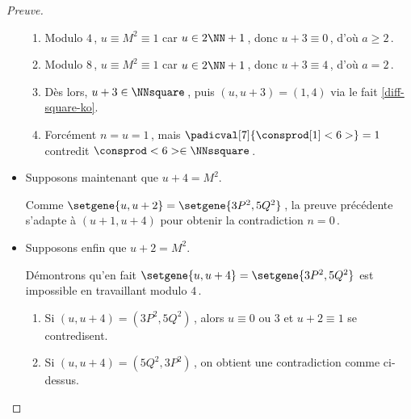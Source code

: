 \begin{proof}[Preuve]
\begin{itemize}
\begin{enumerate}
			\item Modulo $4$\,, $u \equiv M^2 \equiv 1$ car $u \in 2 \NN + 1$\,,
			donc $u + 3 \equiv 0$\,, d'où $a \geq 2$\,.

			\item Modulo $8$\,, $u \equiv M^2 \equiv 1$ car $u \in 2 \NN + 1$\,,
			donc $u + 3 \equiv 4$\,, d'où $a = 2$\,.

			\item Dès lors, $u + 3 \in \NNsquare$\,, puis $(u, u + 3) = (1, 4)$ via le fait \ref{diff-square-ko}.

			\item Forcément $n = u = 1$\,, mais $\padicval[7]{\consprod[1]<6>} = 1$ contredit $\consprod<6> \in \NNssquare$\,.
		\end{enumerate}


    	\item Supposons maintenant que $u + 4 = M^2$.

		\smallskip
		\noindent
		Comme $\setgene{u, u + 2} = \setgene{3P^2, 5Q^2}$\,, la preuve précédente s'adapte à $(u + 1, u + 4)$ pour obtenir la contradiction $n = 0$\,.


    	\item Supposons enfin que $u + 2 = M^2$.

		\smallskip
		\noindent
		Démontrons qu'en fait $\setgene{u, u + 4} = \setgene{3P^2, 5Q^2}$ est impossible en travaillant modulo $4$\,.
		\begin{enumerate}
			\item Si $(u, u + 4) = (3P^2, 5Q^2)$\,, alors 
			$u \equiv \text{$0$ ou $3$}$
			et
			$u + 2 \equiv 1$
			se contredisent.

			\item Si $(u, u + 4) = (5Q^2, 3P^2)$\,, on obtient une contradiction comme ci-dessus.
		\end{enumerate}
    \end{itemize}
\end{proof}

 